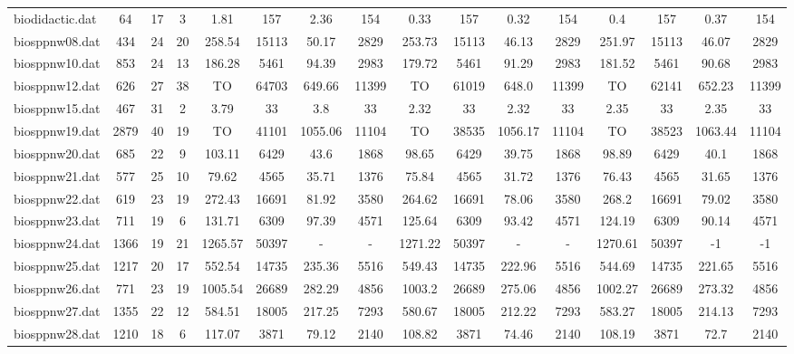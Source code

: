 \begin{sidewaystable}[!ht]
{\begin{tabular}{lccccccccccccccc}
biodidactic.dat & 64 & 17 & 3 & 1.81 & 157 & 2.36 & 154 & 0.33 & 157 &  \textcolor{blue2}{0.32} & 154 & 0.4 & 157 & 0.37 & 154 \\
biosppnw08.dat & 434 & 24 & 20 & 258.54 & 15113 & 50.17 & 2829 & 253.73 & 15113 & 46.13 & 2829 & 251.97 & 15113 & 46.07 & 2829 \\
biosppnw10.dat & 853 & 24 & 13 & 186.28 & 5461 & 94.39 & 2983 & 179.72 & 5461 & 91.29 & 2983 & 181.52 & 5461 & 90.68 & 2983 \\
biosppnw12.dat & 626 & 27 & 38 &  TO & 64703 & 649.66 & 11399 &  TO & 61019 & 648.0 & 11399 &  TO & 62141 & 652.23 & 11399 \\
biosppnw15.dat & 467 & 31 & 2 & 3.79 & 33 & 3.8 & 33 &  \textcolor{blue2}{2.32} & 33 &  \textcolor{blue2}{2.32} & 33 & 2.35 & 33 & 2.35 & 33 \\
biosppnw19.dat & 2879 & 40 & 19 &  TO & 41101 &  \textcolor{blue2}{1055.06} & 11104 &  TO & 38535 & 1056.17 & 11104 &  TO & 38523 & 1063.44 & 11104 \\
biosppnw20.dat & 685 & 22 & 9 & 103.11 & 6429 & 43.6 & 1868 & 98.65 & 6429 &  \textcolor{blue2}{39.75} & 1868 & 98.89 & 6429 & 40.1 & 1868 \\
biosppnw21.dat & 577 & 25 & 10 & 79.62 & 4565 & 35.71 & 1376 & 75.84 & 4565 & 31.72 & 1376 & 76.43 & 4565 & 31.65 & 1376 \\
biosppnw22.dat & 619 & 23 & 19 & 272.43 & 16691 & 81.92 & 3580 & 264.62 & 16691 &  \textcolor{blue2}{78.06} & 3580 & 268.2 & 16691 & 79.02 & 3580 \\
biosppnw23.dat & 711 & 19 & 6 & 131.71 & 6309 & 97.39 & 4571 & 125.64 & 6309 & 93.42 & 4571 & 124.19 & 6309 & 90.14 & 4571 \\
biosppnw24.dat & 1366 & 19 & 21 &  \textcolor{blue2}{1265.57} & 50397 &  - &  - & 1271.22 & 50397 &  - &  - & 1270.61 & 50397 & -1 & -1 \\
biosppnw25.dat & 1217 & 20 & 17 & 552.54 & 14735 & 235.36 & 5516 & 549.43 & 14735 & 222.96 & 5516 & 544.69 & 14735 & 221.65 & 5516 \\
biosppnw26.dat & 771 & 23 & 19 & 1005.54 & 26689 & 282.29 & 4856 & 1003.2 & 26689 & 275.06 & 4856 & 1002.27 & 26689 & 273.32 & 4856 \\
biosppnw27.dat & 1355 & 22 & 12 & 584.51 & 18005 & 217.25 & 7293 & 580.67 & 18005 & 212.22 & 7293 & 583.27 & 18005 & 214.13 & 7293 \\
biosppnw28.dat & 1210 & 18 & 6 & 117.07 & 3871 & 79.12 & 2140 & 108.82 & 3871 & 74.46 & 2140 & 108.19 & 3871 & 72.7 & 2140 \\

\end{tabular}}
\end{sidewaystable}
